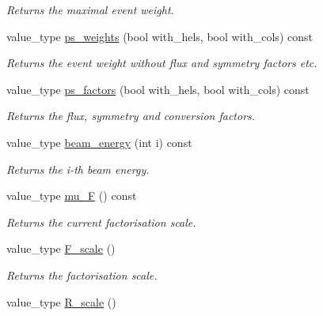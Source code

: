 \begin{DoxyCompactItemize}
\begin{DoxyCompactList}\small\item\em Returns the maximal event weight. \end{DoxyCompactList}\item 
value\-\_\-type \hyperlink{a00210_abf627ab0d6ee6b3124049fd60096be54}{ps\-\_\-weights} (bool with\-\_\-hels, bool with\-\_\-cols) const 
\begin{DoxyCompactList}\small\item\em Returns the event weight without flux and symmetry factors etc. \end{DoxyCompactList}\item 
value\-\_\-type \hyperlink{a00210_a7dcc2b237825ce0f930c02513a31a24c}{ps\-\_\-factors} (bool with\-\_\-hels, bool with\-\_\-cols) const 
\begin{DoxyCompactList}\small\item\em Returns the flux, symmetry and conversion factors. \end{DoxyCompactList}\item 
\hypertarget{a00210_a8387e14e09be662bc515d9429ef941a1}{value\-\_\-type \hyperlink{a00210_a8387e14e09be662bc515d9429ef941a1}{beam\-\_\-energy} (int i) const }\label{a00210_a8387e14e09be662bc515d9429ef941a1}

\begin{DoxyCompactList}\small\item\em Returns the i-\/th beam energy. \end{DoxyCompactList}\item 
\hypertarget{a00210_a5f54990b04f9222933b32b8cd13ac4d8}{value\-\_\-type \hyperlink{a00210_a5f54990b04f9222933b32b8cd13ac4d8}{mu\-\_\-\-F} () const }\label{a00210_a5f54990b04f9222933b32b8cd13ac4d8}

\begin{DoxyCompactList}\small\item\em Returns the current factorisation scale. \end{DoxyCompactList}\item 
\hypertarget{a00210_abe64f2b5afc4b8a008a586fbb438d9c7}{value\-\_\-type \hyperlink{a00210_abe64f2b5afc4b8a008a586fbb438d9c7}{F\-\_\-scale} ()}\label{a00210_abe64f2b5afc4b8a008a586fbb438d9c7}

\begin{DoxyCompactList}\small\item\em Returns the factorisation scale. \end{DoxyCompactList}\item 
\hypertarget{a00210_a8da9cf12c0989e5cdab88598b22e25bd}{value\-\_\-type \hyperlink{a00210_a8da9cf12c0989e5cdab88598b22e25bd}{R\-\_\-scale} ()}\label{a00210_a8da9cf12c0989e5cdab88598b22e25bd}


\end{DoxyCompactItemize}
